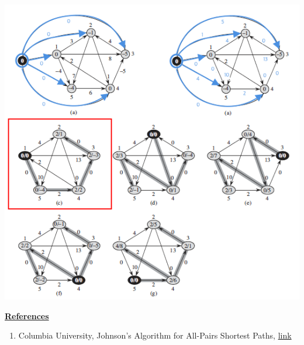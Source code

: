 \documentclass[12pt]{article}
\begin{document}
\begin{enumerate}[1.]
\begin{itemize}
\begin{enumerate}[1.]
            \begin{center}
            \includegraphics[width=\linewidth]{images/worksheet_4_solution_57.png}
            \end{center}
        \end{enumerate}
    \end{itemize}

    \bigskip

    \underline{\textbf{References}}

    \bigskip

    \begin{enumerate}[1)]
        \item Columbia University, Johnson’s Algorithm for All-Pairs Shortest Paths, \href{http://www.columbia.edu/~cs2035/courses/ieor6614.S16/johnson.pdf}{link}
    \end{enumerate}


\end{enumerate}
\end{document}
